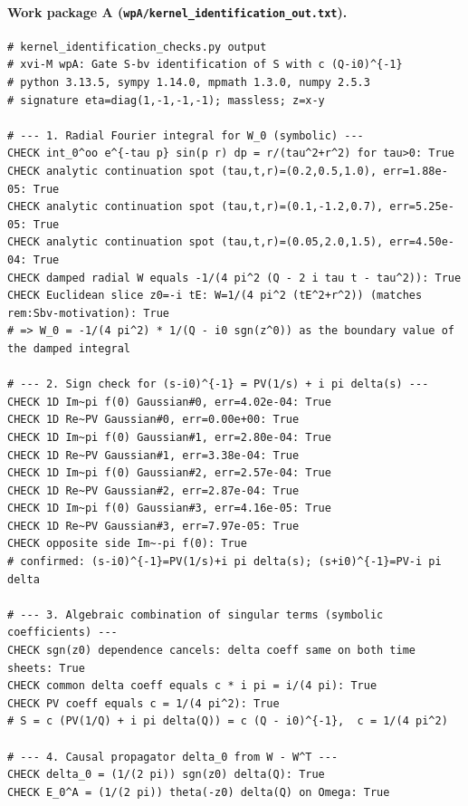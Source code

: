 \documentclass{article}
\theoremstyle{remark}
\begin{document}
\paragraph{Work package A (\texttt{wpA/kernel\_identification\_out.txt}).}
\begin{lstlisting}
# kernel_identification_checks.py output
# xvi-M wpA: Gate S-bv identification of S with c (Q-i0)^{-1}
# python 3.13.5, sympy 1.14.0, mpmath 1.3.0, numpy 2.5.3
# signature eta=diag(1,-1,-1,-1); massless; z=x-y

# --- 1. Radial Fourier integral for W_0 (symbolic) ---
CHECK int_0^oo e^{-tau p} sin(p r) dp = r/(tau^2+r^2) for tau>0: True
CHECK analytic continuation spot (tau,t,r)=(0.2,0.5,1.0), err=1.88e-05: True
CHECK analytic continuation spot (tau,t,r)=(0.1,-1.2,0.7), err=5.25e-05: True
CHECK analytic continuation spot (tau,t,r)=(0.05,2.0,1.5), err=4.50e-04: True
CHECK damped radial W equals -1/(4 pi^2 (Q - 2 i tau t - tau^2)): True
CHECK Euclidean slice z0=-i tE: W=1/(4 pi^2 (tE^2+r^2)) (matches rem:Sbv-motivation): True
# => W_0 = -1/(4 pi^2) * 1/(Q - i0 sgn(z^0)) as the boundary value of the damped integral

# --- 2. Sign check for (s-i0)^{-1} = PV(1/s) + i pi delta(s) ---
CHECK 1D Im~pi f(0) Gaussian#0, err=4.02e-04: True
CHECK 1D Re~PV Gaussian#0, err=0.00e+00: True
CHECK 1D Im~pi f(0) Gaussian#1, err=2.80e-04: True
CHECK 1D Re~PV Gaussian#1, err=3.38e-04: True
CHECK 1D Im~pi f(0) Gaussian#2, err=2.57e-04: True
CHECK 1D Re~PV Gaussian#2, err=2.87e-04: True
CHECK 1D Im~pi f(0) Gaussian#3, err=4.16e-05: True
CHECK 1D Re~PV Gaussian#3, err=7.97e-05: True
CHECK opposite side Im~-pi f(0): True
# confirmed: (s-i0)^{-1}=PV(1/s)+i pi delta(s); (s+i0)^{-1}=PV-i pi delta

# --- 3. Algebraic combination of singular terms (symbolic coefficients) ---
CHECK sgn(z0) dependence cancels: delta coeff same on both time sheets: True
CHECK common delta coeff equals c * i pi = i/(4 pi): True
CHECK PV coeff equals c = 1/(4 pi^2): True
# S = c (PV(1/Q) + i pi delta(Q)) = c (Q - i0)^{-1},  c = 1/(4 pi^2)

# --- 4. Causal propagator delta_0 from W - W^T ---
CHECK delta_0 = (1/(2 pi)) sgn(z0) delta(Q): True
CHECK E_0^A = (1/(2 pi)) theta(-z0) delta(Q) on Omega: True


\end{lstlisting}
\end{document}
